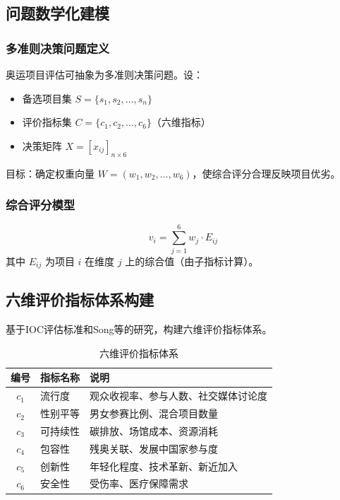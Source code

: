 
\subsection{问题数学化建模}

\subsubsection{多准则决策问题定义}

奥运项目评估可抽象为多准则决策问题。设：
\begin{itemize}
\item 备选项目集 $S = \{s_1, s_2, \ldots, s_n\}$
\item 评价指标集 $C = \{c_1, c_2, \ldots, c_6\}$（六维指标）
\item 决策矩阵 $X = [x_{ij}]_{n \times 6}$
\end{itemize}

目标：确定权重向量 $W = (w_1, w_2, \ldots, w_6)$，使综合评分合理反映项目优劣。

\subsubsection{综合评分模型}

\begin{equation}
v_i = \sum_{j=1}^{6} w_j \cdot E_{ij}
\label{eq:score}
\end{equation}
其中 $E_{ij}$ 为项目 $i$ 在维度 $j$ 上的综合值（由子指标计算）。

\subsection{六维评价指标体系构建}

基于IOC评估标准和Song等\cite{song2025quantifying}的研究，构建六维评价指标体系。

\begin{table}[htbp]
\centering
\caption{六维评价指标体系}
\label{tab:indicators}
\begin{tabular}{cll}
\toprule
编号 & 指标名称 & 说明 \\
\midrule
$c_1$ & 流行度 & 观众收视率、参与人数、社交媒体讨论度 \\
$c_2$ & 性别平等 & 男女参赛比例、混合项目数量 \\
$c_3$ & 可持续性 & 碳排放、场馆成本、资源消耗 \\
$c_4$ & 包容性 & 残奥关联、发展中国家参与度 \\
$c_5$ & 创新性 & 年轻化程度、技术革新、新近加入 \\
$c_6$ & 安全性 & 受伤率、医疗保障需求 \\
\bottomrule
\end{tabular}
\end{table}

